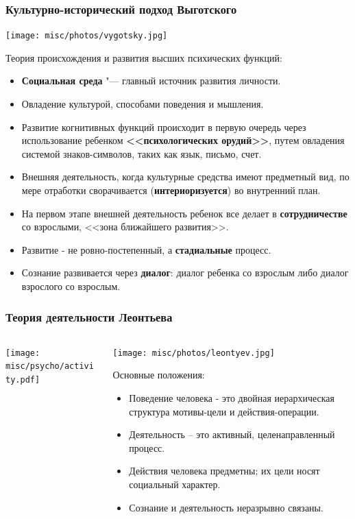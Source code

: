 	\begin{frame}
		\frametitle{Культурно-исторический подход Выготского}
		\begin{center}
			\texttt{[image: misc/photos/vygotsky.jpg]}
		\end{center}
		\scriptsize
		Теория происхождения и развития высших психических функций:
		\begin{itemize}
			\item \textbf{Социальная среда} "--- главный источник развития личности.
			\item Овладение культурой, способами поведения и мышления.
			\item Развитие когнитивных функций происходит в первую очередь через использование ребенком \textbf{<<психологических орудий>>}, путем овладения системой знаков-символов, таких как язык, письмо, счет.
			\item Внешняя деятельность, когда культурные средства имеют предметный вид, по мере отработки сворачивается (\textbf{интериоризуется}) во внутренний план.
			\item На первом этапе внешней деятельность ребенок все делает в \textbf{сотрудничестве} со взрослыми, <<зона ближайшего развития>>.
			\item Развитие - не ровно-постепенный, а \textbf{стадиальные} процесс.
			\item Сознание развивается через \textbf{диалог}: диалог ребенка со взрослым либо диалог взрослого со взрослым.
		\end{itemize}
		\end{frame}
		
		\begin{frame}
		\frametitle{Теория деятельности Леонтьева}
		\begin{columns}
		\begin{column}{0.4\textwidth}
			\texttt{[image: misc/psycho/activity.pdf]}			
		\end{column}
		\begin{column}{0.6\textwidth}
			\begin{center}
				\texttt{[image: misc/photos/leontyev.jpg]}
			\end{center}
			Основные положения:
			\begin{itemize}
				\item Поведение человека - это двойная иерархическая структура мотивы-цели и действия-операции.
				\item Деятельность – это активный, целенаправленный процесс.
				\item Действия человека предметны; их цели носят социальный характер.
				\item Сознание и деятельность неразрывно связаны.
			\end{itemize}
		\end{column}
		\end{columns}
	\end{frame}

